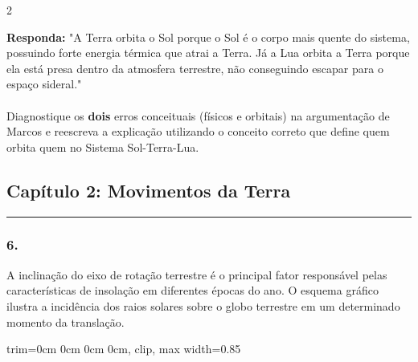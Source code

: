 \documentclass[twoside, 10pt, a4paper]{article}
\newlength{\espacoPosTitulo}
\newlength{\espacoQuestao}
\newcommand{\larguraTikz}{0.85\linewidth} %
\begin{document}
\begin{multicols*}{2}
\begin{boxresponda}
\textbf{Responda:} "A Terra orbita o Sol porque o Sol é o corpo mais quente do sistema, possuindo forte energia térmica que atrai a Terra. Já a Lua orbita a Terra porque ela está presa dentro da atmosfera terrestre, não conseguindo escapar para o espaço sideral."\\
\\
Diagnostique os \textbf{dois} erros conceituais (físicos e orbitais) na argumentação de Marcos e reescreva a explicação utilizando o conceito correto que define quem orbita quem no Sistema Sol-Terra-Lua.
\end{boxresponda}
\par\vspace{\espacoQuestao}

\subsection*{Capítulo 2: Movimentos da Terra}
\vspace{-0.2cm}\noindent\rule{\linewidth}{1.5pt} 
\par\vspace{\espacoPosTitulo}
\subsubsection*{6.} A inclinação do eixo de rotação terrestre é o principal fator responsável pelas características de insolação em diferentes épocas do ano. O esquema gráfico ilustra a incidência dos raios solares sobre o globo terrestre em um determinado momento da translação. 

\begin{center}
\begin{adjustbox}{trim=0cm 0cm 0cm 0cm, clip, max width=\larguraTikz}
\end{adjustbox}
\end{center}
\end{multicols*}
\end{document}

